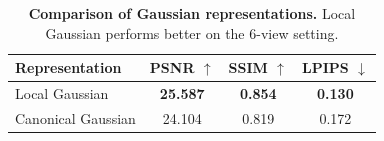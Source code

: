 \begin{table}[h]
\centering
\caption{\textbf{Comparison of Gaussian representations.} 
Local Gaussian performs better on the 6-view setting.}
\begin{tabular}{l|ccc}
\toprule
Representation & PSNR $\uparrow$ & SSIM $\uparrow$ & LPIPS $\downarrow$ \\
\midrule
\rowcolor{gray!10}
Local Gaussian      & \textbf{25.587} & \textbf{0.854} & \textbf{0.130} \\
Canonical Gaussian  & 24.104 & 0.819 & 0.172 \\
\bottomrule
\end{tabular}
\label{tab:ablation_gaussain}
\end{table}
